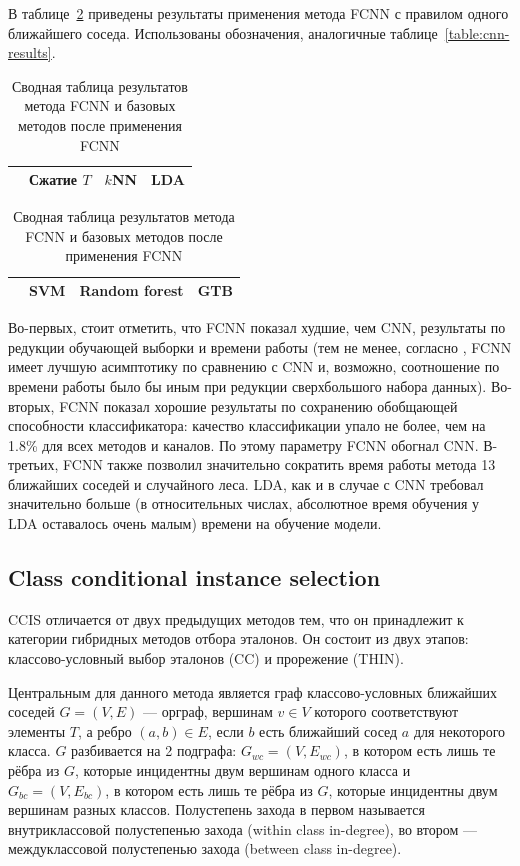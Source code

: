 В таблице~\ref{table:fcnn-results} приведены результаты применения метода FCNN с правилом одного ближайшего соседа. Использованы обозначения, аналогичные таблице~\ref{table:cnn-results}.
\begin{table}[h!]
    \centering
    \begin{tabular}{|c||c||c|c|}
    \cline{2-4}
    \multicolumn{1}{c||}{} & Сжатие \(T\) & \(k\)NN & LDA \\
    \hline \hline
	
\end{tabular}
\newline \vspace*{0.5cm} \newline
\begin{tabular}{|c||c|c|c|}
    \cline{2-4}
    \multicolumn{1}{c||}{} & SVM & Random forest & GTB \\
    \hline \hline
	
    \end{tabular}
    \caption{Сводная таблица результатов метода FCNN и базовых методов после применения FCNN}
    \label{table:fcnn-results}
\end{table}

Во-первых, стоит отметить, что FCNN показал худшие, чем CNN, результаты по редукции обучающей выборки и времени работы (тем не менее, согласно \cite{angiulli}, FCNN имеет лучшую асимптотику по сравнению с CNN и, возможно, соотношение по времени работы было бы иным при редукции сверхбольшого набора данных). Во-вторых, FCNN показал хорошие результаты по сохранению обобщающей способности классификатора: качество классификации упало не более, чем на 1.8\% для всех методов и каналов. По этому параметру FCNN обогнал CNN. В-третьих, FCNN также позволил значительно сократить время работы метода 13 ближайших соседей и случайного леса. LDA, как и в случае с CNN требовал значительно больше (в относительных числах, абсолютное время обучения у LDA оставалось очень малым) времени на обучение модели.

\subsection{Class conditional instance selection}
CCIS \cite{marchiori} отличается от двух предыдущих методов тем, что он принадлежит к категории гибридных методов отбора эталонов. Он состоит из двух этапов: классово-условный выбор эталонов (CC) и прорежение (THIN).

Центральным для данного метода является граф классово-условных ближайших соседей \(G=(V,E)\) --- орграф, вершинам \(v\in V\) которого соответствуют элементы \(T\), а ребро \((a,b)\in E\), если \(b\) есть ближайший сосед \(a\) для некоторого класса. \(G\) разбивается на 2 подграфа: \(G_{wc}=(V,E_{wc})\), в котором есть лишь те рёбра из \(G\), которые инцидентны двум вершинам одного класса и \(G_{bc}=(V,E_{bc})\), в котором есть лишь те рёбра из \(G\), которые инцидентны двум вершинам разных классов. Полустепень захода в первом называется внутриклассовой полустепенью захода (within class in-degree), во втором --- междуклассовой полустепенью захода (between class in-degree).

